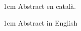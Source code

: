 \documentclass[spanish,final]{setup/eetac_tfc_pfc}
\begin{document}

\beforepreface  


\begin{resum}{1cm}
Abstract en català.

\end{resum}

\begin{overview}{1cm}
Abstract in English

\end{overview}


\def\listtablename{Índice de tablas}
\def\tablename{Tabla}%



\afterpreface




%         

\end{document}
